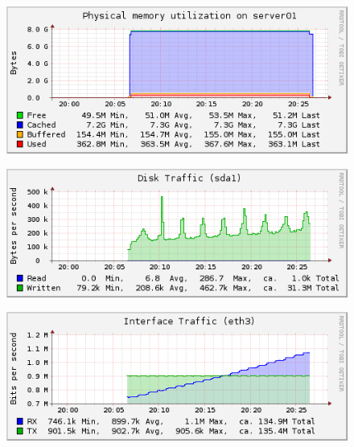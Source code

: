 \documentclass[Measurement results]{subfiles}
\begin{document}
\begin{figure}[H]
\centering
\includegraphics[scale=0.7]{images/results/wp_with_naxsi_incremented_disallowed_parameters/memory.png}
\end{figure}

\begin{figure}[H]
\centering
\includegraphics[scale=0.7]{images/results/wp_with_naxsi_incremented_disallowed_parameters/disk.png}
\end{figure}

\begin{figure}[H]
\centering
\includegraphics[scale=0.7]{images/results/wp_with_naxsi_incremented_disallowed_parameters/interface.png}
\end{figure}

\newpage
\end{document}
